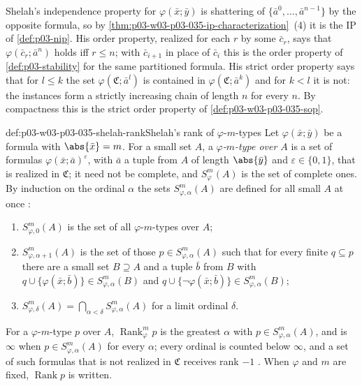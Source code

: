 Shelah's independence property for \(\varphi(\bar x;\bar y)\) is
shattering of \(\{\bar a^0,\ldots,\bar a^{n-1}\}\) by the opposite formula,
so by \cref{thm:p03-w03-p03-035-ip-characterization}~(4) it is the IP of
\cref{def:p03-nip}.  His order property, realized for each \(r\) by some
\(\bar c_r\), says that \(\varphi(\bar c_r;\bar a^n)\) holds iff
\(r\leq n\); with \(\bar c_{i+1}\) in place of \(\bar c_i\) this is the order
property of \cref{def:p03-stability} for the same partitioned formula.  His
strict order property says that for \(l\leq k\) the set
\(\varphi(\mathfrak C;\bar a^l)\) is contained in
\(\varphi(\mathfrak C;\bar a^k)\) and for \(k<l\) it is not: the instances
form a strictly increasing chain of length \(n\) for every \(n\).  By
compactness this is the strict order property of
\cref{def:p03-w03-p03-035-sop}.

\begin{hbdefinition}{def:p03-w03-p03-035-shelah-rank}{Shelah's rank of \(\varphi\)-\(m\)-types}
Let \(\varphi(\bar x;\bar y)\) be a formula with \(\abs{\bar x}=m\).  For a
small set \(A\), a \emph{\(\varphi\)-\(m\)-type over \(A\)} is a set of
formulas \(\varphi(\bar x;\bar a)^{\varepsilon}\), with \(\bar a\) a tuple
from \(A\) of length \(\abs{\bar y}\) and \(\varepsilon\in\{0,1\}\), that is
realized in \(\mathfrak C\); it need not be complete, and \(S^m_\varphi(A)\)
is the set of complete ones.  By induction on the ordinal \(\alpha\) the sets
\(S^m_{\varphi,\alpha}(A)\) are defined for all small \(A\) at once
\cite[Definition~2.4, p.~299]{Shelah1971Stability}:
\begin{enumerate}
  \item \(S^m_{\varphi,0}(A)\) is the set of all \(\varphi\)-\(m\)-types over
        \(A\);
  \item \(S^m_{\varphi,\alpha+1}(A)\) is the set of those
        \(p\in S^m_{\varphi,\alpha}(A)\) such that for every finite
        \(q\subseteq p\) there are a small set \(B\supseteq A\) and a tuple
        \(\bar b\) from \(B\) with
        \(q\cup\{\varphi(\bar x;\bar b)\}\in S^m_{\varphi,\alpha}(B)\) and
        \(q\cup\{\neg\varphi(\bar x;\bar b)\}\in S^m_{\varphi,\alpha}(B)\);
  \item \(S^m_{\varphi,\delta}(A)=\bigcap_{\alpha<\delta}S^m_{\varphi,\alpha}(A)\)
        for a limit ordinal \(\delta\).
\end{enumerate}
For a \(\varphi\)-\(m\)-type \(p\) over \(A\), \(\operatorname{Rank}^m_\varphi p\)
is the greatest \(\alpha\) with \(p\in S^m_{\varphi,\alpha}(A)\), and is
\(\infty\) when \(p\in S^m_{\varphi,\alpha}(A)\) for every \(\alpha\); every
ordinal is counted below \(\infty\), and a set of such formulas that is not
realized in \(\mathfrak C\) receives rank \(-1\)
\cite[Definition~2.5, p.~300]{Shelah1971Stability}.  When \(\varphi\) and
\(m\) are fixed, \(\operatorname{Rank}p\) is written.
\end{hbdefinition}

